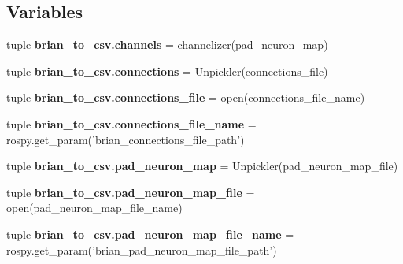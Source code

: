 \subsection*{\-Variables}
\begin{DoxyCompactItemize}
\item 
tuple {\bf brian\-\_\-to\-\_\-csv.\-channels} = channelizer(pad\-\_\-neuron\-\_\-map)
\item 
tuple {\bf brian\-\_\-to\-\_\-csv.\-connections} = \-Unpickler(connections\-\_\-file)
\item 
tuple {\bf brian\-\_\-to\-\_\-csv.\-connections\-\_\-file} = open(connections\-\_\-file\-\_\-name)
\item 
tuple {\bf brian\-\_\-to\-\_\-csv.\-connections\-\_\-file\-\_\-name} = rospy.\-get\-\_\-param('brian\-\_\-connections\-\_\-file\-\_\-path')
\item 
tuple {\bf brian\-\_\-to\-\_\-csv.\-pad\-\_\-neuron\-\_\-map} = \-Unpickler(pad\-\_\-neuron\-\_\-map\-\_\-file)
\item 
tuple {\bf brian\-\_\-to\-\_\-csv.\-pad\-\_\-neuron\-\_\-map\-\_\-file} = open(pad\-\_\-neuron\-\_\-map\-\_\-file\-\_\-name)
\item 
tuple {\bf brian\-\_\-to\-\_\-csv.\-pad\-\_\-neuron\-\_\-map\-\_\-file\-\_\-name} = rospy.\-get\-\_\-param('brian\-\_\-pad\-\_\-neuron\-\_\-map\-\_\-file\-\_\-path')
\end{DoxyCompactItemize}
